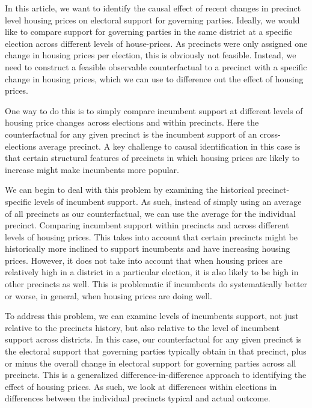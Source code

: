 \documentclass[12pt,a4paper]{article}
\begin{document}
			In this article, we want to identify the causal effect of recent changes in precinct level housing prices on electoral support for governing parties. Ideally, we would like to compare support for governing parties in the same district at a specific election across different levels of house-prices. As precincts were only assigned one change in housing prices per election, this is obviously not feasible. Instead, we need to construct a feasible observable counterfactual to a precinct with a specific change in housing prices, which we can use to difference out the effect of housing prices.
			
			One way to do this is to simply compare incumbent support at different levels of housing price changes across elections and within precincts. Here the counterfactual for any given precinct is the incumbent support of an cross-elections average precinct. A key challenge to causal identification in this case is that certain structural features of precincts in which housing prices are likely to increase might make incumbents more popular.
			
			We can begin to deal with this problem by examining the historical precinct-specific levels of incumbent support. As such, instead of simply using an average of all precincts as our counterfactual, we can use the average for the individual precinct. Comparing incumbent support within precincts and across different levels of housing prices. This takes into account that certain precincts might be historically more inclined to support incumbents and have increasing housing prices. However, it does not take into account that when housing prices are relatively high in a district in a particular election, it is also likely to be high in other precincts as well. This is problematic if incumbents do systematically better or worse, in general, when housing prices are doing well.
			
			To address this problem, we can examine levels of incumbents support, not just relative to the precincts history, but also relative to the level of incumbent support across districts. In this case, our counterfactual for any given precinct is the electoral support that governing parties typically obtain in that precinct, plus or minus the overall change in electoral support for governing parties across all precincts. This is a generalized difference-in-difference approach to identifying the effect of housing prices. As such, we look at differences within elections in differences between the individual precincts typical and actual outcome.
			
\end{document}
